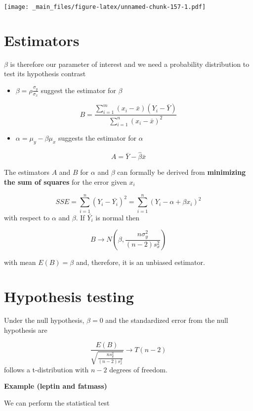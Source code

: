\documentclass[
]{book}
\providecommand{\tightlist}{%
  \setlength{\itemsep}{0pt}\setlength{\parskip}{0pt}}
\begin{document}
\texttt{[image: \_main\_files/figure-latex/unnamed-chunk-157-1.pdf]}

\hypertarget{estimators-1}{%
\section{Estimators}\label{estimators-1}}

\(\beta\) is therefore our parameter of interest and we need a probability distribution to test its hypothesis contrast

\begin{itemize}
\tightlist
\item
  \(\beta=\rho\frac{\sigma_y}{\sigma_x}\) suggest the estimator for \(\beta\)
\end{itemize}

\[B=\frac{\sum_{i=1}^m(x_i-\bar{x})(Y_i-\bar{Y})}{\sum_{i=1}^n(x_i-\bar{x})^2}\]

\begin{itemize}
\tightlist
\item
  \(\alpha=\mu_y-\beta\mu_x\) suggests the estimator for \(\alpha\)
\end{itemize}

\[A=\bar{Y}- \hat{\beta}\bar{x}\]

The estimators \(A\) and \(B\) for \(\alpha\) and \(\beta\) can formally be derived from \textbf{minimizing the sum of squares} for the error given \(x_i\)

\[SSE=\sum_{i=1}^n(Y_i-\bar{Y_i})^2=\sum_{i=1}^n(Y_i-\alpha + \beta x_i)^2\]
with respect to \(\alpha\) and \(\beta\). If \(\bar{Y_i}\) is normal then

\[B \rightarrow N(\beta, \frac{n\sigma^2_y}{{(n-2)s^2_x}})\]

with mean \(E(B)=\beta\) and, therefore, it is an unbiased estimator.

\hypertarget{hypothesis-testing-2}{%
\section{Hypothesis testing}\label{hypothesis-testing-2}}

Under the null hypothesis, \(\beta=0\) and the standardized error from the null hypothesis are

\[\frac{E(B)}{\sqrt{\frac{ns^2_y}{{(n-2)s^2_x}}}} \rightarrow T(n-2)\]
follows a t-distribution with \(n-2\) degrees of freedom.

\textbf{Example (leptin and fatmass)}

We can perform the statistical test
\end{document}
